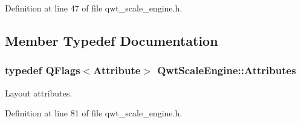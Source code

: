 Definition at line 47 of file qwt\-\_\-scale\-\_\-engine.\-h.



\subsection{Member Typedef Documentation}
\hypertarget{class_qwt_scale_engine_a798f5f1420019d33baa799d26bca0255}{
\subsubsection[{Attributes}]{\setlength{\rightskip}{0pt plus 5cm}typedef Q\-Flags$<${\bf Attribute}$>$ {\bf Qwt\-Scale\-Engine\-::\-Attributes}}}\label{class_qwt_scale_engine_a798f5f1420019d33baa799d26bca0255}


Layout attributes. 



Definition at line 81 of file qwt\-\_\-scale\-\_\-engine.\-h.



